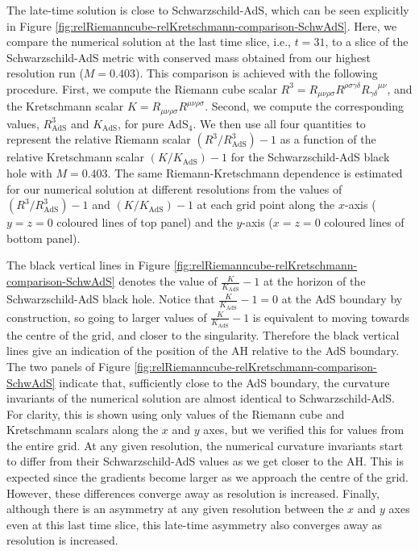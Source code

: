\documentclass[aps,letterpaper,twocolumn,nofootinbib]{revtex4}
\numberwithin{equation}{section}
\begin{document}
The late-time solution is close to Schwarzschild-AdS, which can be seen explicitly in Figure \ref{fig:relRiemanncube-relKretschmann-comparison-SchwAdS}.
Here, we compare the numerical solution at the last time slice, i.e., $t=31$, to a slice of the Schwarzschild-AdS metric with conserved mass obtained from our highest resolution run ($M=0.403$).
This comparison is achieved with the following procedure.
First, we compute the Riemann cube scalar $R^3=R_{\mu\nu\rho\sigma}R^{\rho\sigma\gamma\delta}{R_{\gamma\delta}}^{\mu\nu}$, and the Kretschmann scalar $K=R_{\mu\nu\rho\sigma}R^{\mu\nu\rho\sigma}$.
Second, we compute the corresponding values, $R^3_{\text{AdS}}$ and $K_{\text{AdS}}$, for pure AdS$_4$.
We then use all four quantities to represent the relative Riemann scalar $(R^3/R^3_{\text{AdS}})-1$ as a function of the relative Kretschmann scalar $(K/K_{\text{AdS}})-1$ for the Schwarzschild-AdS black hole with $M=0.403$.
The same Riemann-Kretschmann dependence is estimated for our numerical solution at different resolutions from the values of $(R^3/R^3_{\text{AdS}})-1$ and $(K/K_{\text{AdS}})-1$ at each grid point along the $x$-axis ($y=z=0$ coloured lines of top panel) and the $y$-axis ($x=z=0$ coloured lines of bottom panel).

The black vertical lines in Figure \ref{fig:relRiemanncube-relKretschmann-comparison-SchwAdS} denotes the value of $\frac{K}{K_{\text{AdS}}}-1$ at the horizon of the Schwarzschild-AdS black hole. 
Notice that $\frac{K}{K_{\text{AdS}}}-1=0$ at the AdS boundary by construction, so going to larger values of $\frac{K}{K_{\text{AdS}}}-1$ is equivalent to moving towards the centre of the grid, and closer to the singularity.
Therefore the black vertical lines give an indication of the position of the AH relative to the AdS boundary.
The two panels of Figure \ref{fig:relRiemanncube-relKretschmann-comparison-SchwAdS} indicate that, sufficiently close to the AdS boundary, the curvature invariants of the numerical solution are almost identical to Schwarzschild-AdS. For clarity, this is shown using only values of the Riemann cube and Kretschmann scalars along the $x$ and $y$ axes, but we verified this for values from the entire grid. 
At any given resolution, the numerical curvature invariants start to differ from their Schwarzschild-AdS values as we get closer to the AH. This is expected since the gradients become larger as we approach the centre of the grid.
However, these differences converge away as resolution is increased.
Finally, although there is an asymmetry at any given resolution between the $x$ and $y$ axes even at this last time slice, this late-time asymmetry also converges away as resolution is increased.
\end{document}
